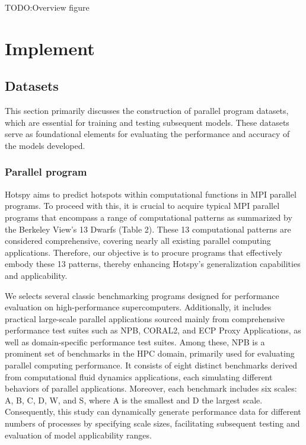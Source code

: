 \documentclass[lineno,sn-mathphys]{sn-jnl}%
\theoremstyle{thmstyleone}%
\theoremstyle{thmstyletwo}%
\theoremstyle{thmstylethree}%
\begin{document}
TODO:Overview figure

\section{Implement}
\label{sec:implement}
\subsection{Datasets}
This section primarily discusses the construction of parallel program datasets, which are essential for training and testing subsequent models. These datasets serve as foundational elements for evaluating the performance and accuracy of the models developed.
\subsubsection{Parallel program}
Hotspy aims to predict hotspots within computational functions in MPI parallel programs. To proceed with this, it is crucial to acquire typical MPI parallel programs that encompass a range of computational patterns as summarized by the Berkeley View's 13 Dwarfs (Table 2). These 13 computational patterns are considered comprehensive, covering nearly all existing parallel computing applications. Therefore, our objective is to procure programs that effectively embody these 13 patterns, thereby enhancing Hotspy's generalization capabilities and applicability.\par
We selects several classic benchmarking programs designed for performance evaluation on high-performance supercomputers. Additionally, it includes practical large-scale parallel applications sourced mainly from comprehensive performance test suites such as NPB, CORAL2, and ECP Proxy Applications, as well as domain-specific performance test suites. Among these, NPB is a prominent set of benchmarks in the HPC domain, primarily used for evaluating parallel computing performance. It consists of eight distinct benchmarks derived from computational fluid dynamics applications, each simulating different behaviors of parallel applications. Moreover, each benchmark includes six scales: A, B, C, D, W, and S, where A is the smallest and D the largest scale. Consequently, this study can dynamically generate performance data for different numbers of processes by specifying scale sizes, facilitating subsequent testing and evaluation of model applicability ranges.
\end{document}
